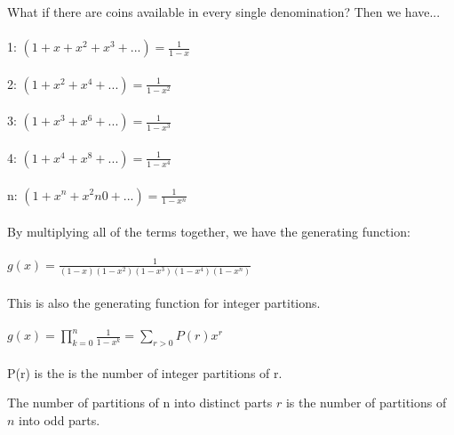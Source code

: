 \begin{solution}
What if there are coins available in every single denomination?
Then we have... \\\\
1\textcent{}: $(1+x+x^2+x^3+...)=\frac{1}{1-x}$ \\\\
2\textcent{}: $(1+x^2+x^4+...)=\frac{1}{1-x^2}$\\\\
3\textcent{}: $(1+x^3+x^6+...)=\frac{1}{1-x^3}$\\\\
4\textcent{}: $(1+x^4+x^8+...)=\frac{1}{1-x^4}$\\\\
n\textcent{}: $(1+x^n+x^2n0+...)=\frac{1}{1-x^n}$\\\\
By multiplying all of the terms together, we have the generating function: \\\\
$g(x)=\frac{1}{(1-x)(1-x^2)(1-x^3)(1-x^4)(1-x^n)}$ \\\\
This is also the generating function for integer partitions. \\\\
$g(x) = \prod_{k=0}^n \frac{1}{1-x^k} = \sum_{r>0} P(r)x^r $ \\\\
P(r) is the is the number of integer partitions of r.
\end{solution}



\begin{theorem}The number of partitions of n into distinct parts $r$ is the number of partitions of $n$ into odd parts.\end{theorem}

